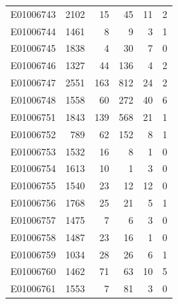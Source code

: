 \documentclass[
  letterpaper,
  DIV=11,
  numbers=noendperiod]{scrreprt}
\begin{document}
\begin{tabular}{lrrrrr}
E01006743     &    2102 &      15 &                    45 &                              11 &                       2 \\
E01006744     &    1461 &       8 &                     9 &                               3 &                       1 \\
E01006745     &    1838 &       4 &                    30 &                               7 &                       0 \\
E01006746     &    1327 &      44 &                   136 &                               4 &                       2 \\
E01006747     &    2551 &     163 &                   812 &                              24 &                       2 \\
E01006748     &    1558 &      60 &                   272 &                              40 &                       6 \\
E01006751     &    1843 &     139 &                   568 &                              21 &                       1 \\
E01006752     &     789 &      62 &                   152 &                               8 &                       1 \\
E01006753     &    1532 &      16 &                     8 &                               1 &                       0 \\
E01006754     &    1613 &      10 &                     1 &                               3 &                       0 \\
E01006755     &    1540 &      23 &                    12 &                              12 &                       0 \\
E01006756     &    1768 &      25 &                    21 &                               5 &                       1 \\
E01006757     &    1475 &       7 &                     6 &                               3 &                       0 \\
E01006758     &    1487 &      23 &                    16 &                               1 &                       0 \\
E01006759     &    1034 &      28 &                    26 &                               6 &                       1 \\
E01006760     &    1462 &      71 &                    63 &                              10 &                       5 \\
E01006761     &    1553 &       7 &                    81 &                               3 &                       0 \\

\end{tabular}
\end{document}
